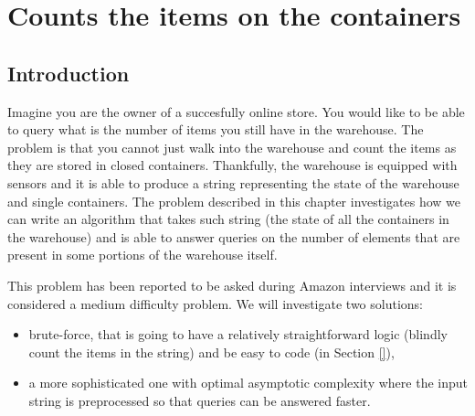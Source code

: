 %

\chapter{Counts the items on the containers}
\label{ch:items_in_containers_amazon}
\section*{Introduction}
Imagine you are the owner of a succesfully online store. 
You would like to be able to query what is the number of items you still have in the warehouse.
The problem is that you cannot just walk into the warehouse and count the items as they are stored in closed containers. 
Thankfully, the warehouse is equipped with sensors and it is able to produce a string representing 
the state of the warehouse and single containers. 
The problem described in this chapter investigates how we can write an algorithm
that takes such string (the state of all the containers in the warehouse) and is able to answer queries on the number of elements that are present 
in some portions of the warehouse itself. 

This problem has been reported to be asked during Amazon interviews and it is considered a medium difficulty problem.
We will investigate two solutions:
\begin{itemize}
	\item brute-force, that is going to have a relatively straightforward logic (blindly count the items in the string)
	 and be easy to code (in Section \ref{}),
	\item a more sophisticated one with optimal asymptotic complexity where the input string is preprocessed so that queries can be answered faster.
\end{itemize}



